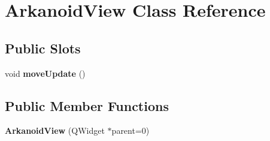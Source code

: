 \hypertarget{class_arkanoid_view}{\section{\-Arkanoid\-View \-Class \-Reference}
\label{class_arkanoid_view}
}
\subsection*{\-Public \-Slots}
\begin{DoxyCompactItemize}
\item 
\hypertarget{class_arkanoid_view_a100ba0118cded14db9dc6fcdd6d82d2c}{void {\bfseries move\-Update} ()}\label{class_arkanoid_view_a100ba0118cded14db9dc6fcdd6d82d2c}

\end{DoxyCompactItemize}
\subsection*{\-Public \-Member \-Functions}
\begin{DoxyCompactItemize}
\item 
\hypertarget{class_arkanoid_view_a1c77c361f7102a8f5a7c64bc8c9c394a}{{\bfseries \-Arkanoid\-View} (\-Q\-Widget $\ast$parent=0)}\label{class_arkanoid_view_a1c77c361f7102a8f5a7c64bc8c9c394a}

\end{DoxyCompactItemize}
